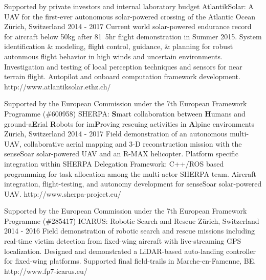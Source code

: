 \begin{cventries}
  \cvprojentry
    {Supported by private investors and internal laboratory budget} %
    {AtlantikSolar: A UAV for the first-ever autonomous solar-powered crossing of the Atlantic Ocean} %
    {Z\"{u}rich, Switzerland} %
    {2014 - 2017} %
    {Current world solar-powered endurance record for aircraft below \unit{50}{kg} after \unit{81.5}{hr} flight demonstration in Summer 2015.} %
    {System identification \& modeling, flight control, guidance, \& planning for robust autonmous flight behavior in high winds and uncertain environments. Investigation and testing of local perception techniques and sensors for near terrain flight. Autopilot and onboard computation framework development.} %
	{http://www.atlantiksolar.ethz.ch/}
	
  \cvprojentry
    {Supported by the European Commission under the 7th European Framework Programme (\#600958)} %
    {SHERPA: \textbf{S}mart collaboration between \textbf{H}umans and ground-a\textbf{E}rial \textbf{R}obots for im\textbf{P}roving rescuing activities in \textbf{A}lpine environments} %
    {Z\"{u}rich, Switzerland} %
    {2014 - 2017} %
    {Field demonstration of an autonomous multi-UAV, collaborative aerial mapping and 3-D reconstruction mission with the senseSoar solar-powered UAV and an R-MAX helicopter.} %
    {Platform specific integration within SHERPA Delegation Framework: C++/ROS based programming for task
allocation among the multi-actor SHERPA team. Aircraft integration, flight-testing, and autonomy development for senseSoar solar-powered UAV.} %
	{http://www.sherpa-project.eu/}

  \cvprojentry
    {Supported by the European Commission under the 7th European Framework Programme (\#285417)} %
    {ICARUS: Robotic Search and Rescue} %
    {Z\"{u}rich, Switzerland} %
    {2014 - 2016} %
    {Field demonstration of robotic search and rescue missions including real-time victim detection from fixed-wing aircraft with live-streaming GPS localization.} %
    {Designed and demonstrated a LiDAR-based auto-landing controller for fixed-wing platforms. Supported final field-trails in Marche-en-Famenne, BE.} %
    {http://www.fp7-icarus.eu/}
    

\end{cventries}
